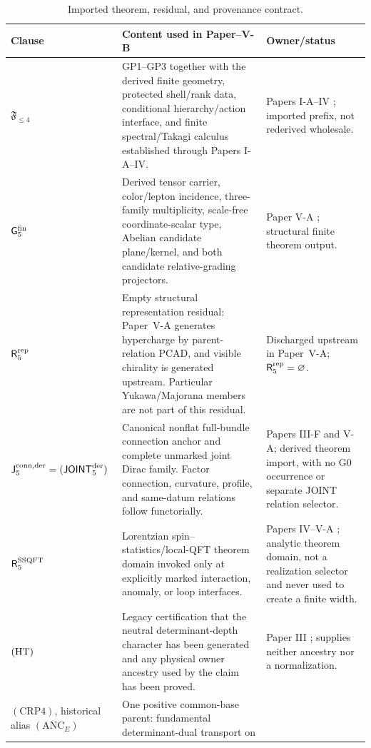 \documentclass[12pt,a4paper]{article}
\newcommand{\Gfive}{\mathsf G_5^{\rm fin}}
\newcommand{\Rrep}{\mathsf R_5^{\rm rep}}
\newcommand{\Rconn}{\mathsf J_5^{\rm conn,der}}
\newcommand{\Rssqft}{\mathsf R_5^{\rm SSQFT}}
\newcommand{\JOINTfiveocc}{\mathsf{JOINT}_5^{\rm der}}
\newcommand{\pvcite}[1]{\cite{#1}}
\begin{document}
\begin{table}[H]
\centering
\caption{Imported theorem, residual, and provenance contract.}
\label{p6:tab:imported-hypotheses}
\scriptsize
\setlength{\tabcolsep}{3pt}
\renewcommand{\arraystretch}{1.12}
\begin{tabularx}{\textwidth}{@{}L{0.18\textwidth}L{0.49\textwidth}Y@{}}
\toprule
Clause & Content used in Paper--V-B & Owner/status \\
\midrule
\(\mathfrak F_{\le4}\)
& GP1--GP3 together with the derived finite geometry, protected shell/rank
data, conditional hierarchy/action interface, and finite spectral/Takagi
calculus established through Papers I-A--IV.
& Papers I-A--IV \pvcite{Kugelmann2026a,Kugelmann2026b,Kugelmann2026c,Kugelmann2026e};
imported prefix, not rederived wholesale.\\
\(\Gfive\)
& Derived tensor carrier, color/lepton incidence, three-family multiplicity,
scale-free coordinate-scalar type, Abelian candidate plane/kernel, and both
candidate relative-grading projectors.
& Paper V-A \pvcite{Kugelmann2026f}; structural finite theorem output.\\
\(\Rrep\)
& Empty structural representation residual: Paper~V-A generates hypercharge by
parent-relation PCAD, and visible chirality is generated upstream.  Particular
Yukawa/Majorana members are not part of this residual.
& Discharged upstream in Paper~V-A; \(\Rrep=\varnothing\).\\
\(\Rconn=(\JOINTfiveocc)\)
& Canonical nonflat full-bundle connection anchor and complete unmarked joint
Dirac family.  Factor connection, curvature, profile, and same-datum
relations follow functorially.
& Papers III-F and V-A; derived theorem import, with no G0 occurrence or
separate JOINT relation selector.\\
\(\Rssqft\)
& Lorentzian spin--statistics/local-QFT theorem domain invoked only at
explicitly marked interaction, anomaly, or loop interfaces.
& Papers IV--V-A \pvcite{Kugelmann2026e,Kugelmann2026f}; analytic theorem domain,
not a realization selector and never used to create a finite width.\\
\(({\rm HT})\)
& Legacy certification that the neutral determinant-depth character has been
generated and any physical owner ancestry used by the claim has been proved.
& Paper III \pvcite{Kugelmann2026c}; supplies neither ancestry nor a
normalization.\\
\((\mathrm{CRP4})\), historical alias \((\mathrm{ANC}_E)\)
& One positive common-base parent: fundamental determinant-dual transport on

\end{tabularx}
\end{table}
\end{document}

